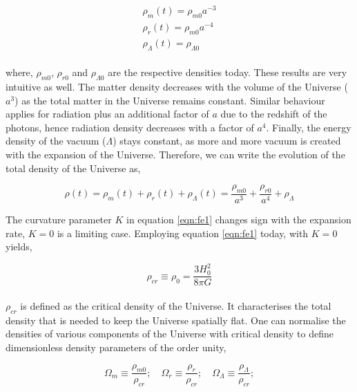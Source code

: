 \begin{equation}
\begin{array}{l}
\rho_m(t) = \rho_{m0} a^{-3} \\
\rho_r(t) = \rho_{m0} a^{-4} \\
\rho_{\Lambda}(t) = \rho_{\Lambda 0}

\end{array} 
\label{eq:xdef}
\end{equation}
\\ 
where, $\rho_{m0}$, $\rho_{r0}$ and $\rho_{\Lambda 0}$ are the respective densities
today. These results are very intuitive as well. The matter density decreases with the volume 
of the Universe ($a^3$) as the total matter in the Universe remains constant. Similar
behaviour applies for radiation plus an additional factor of $a$ due to the redshift
of the photons, hence radiation density decreases with a factor of $a^4$. Finally, the
energy density of the vacuum ($\Lambda$) stays constant, 
as more and more vacuum is created with the expansion of the Universe. Therefore,
we can write the evolution of the total density of the Universe as,

\begin{equation}
	\rho(t) = \rho_m(t)+\rho_r(t)+\rho_{\Lambda}(t) = \dfrac{\rho_{m0}}{a^3} + 
				\dfrac{\rho_{r0}}{a^4} + \rho_{\Lambda}
	\label{eqn:dens}
\end{equation}



The curvature parameter $K$ in equation \ref{eqn:fe1} changes sign with the expansion 
rate, $K=0$ is a limiting case. Employing equation \ref{eqn:fe1} today, with
$K=0$ yields,

\begin{equation}
	\rho_{cr} \equiv \rho_0 = \dfrac{3H_0^2}{8\pi G}
\end{equation}
\\
$\rho_{cr}$ is defined as the critical density of the Universe. It characterises the total density
that is needed to keep the Universe spatially flat. One can normalise the densities of
various components of the Universe with critical density to define dimensionless density
parameters of the order unity,

\begin{equation}
	\Omega_m \equiv \dfrac{\rho_{m0}}{\rho_{cr}};\quad
	\Omega_r \equiv \dfrac{\rho_{r}}{\rho_{cr}};\quad
	\Omega_{\Lambda} \equiv \dfrac{\rho_{\Lambda}}{\rho_{cr}};
	\label{eqn:Omega}
\end{equation}

